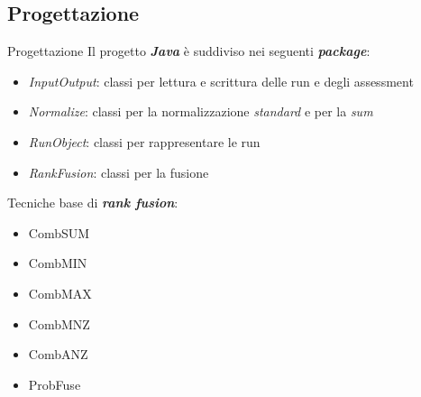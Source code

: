 \subsection{Progettazione}
\begin{frame}{Progettazione}
	Il progetto \textbf{\textit{Java}} è suddiviso nei seguenti \textbf{\textit{package}}:
	\begin{itemize}
		\item \textit{InputOutput}: classi per lettura e scrittura delle run e degli assessment 
		\item \textit{Normalize}: classi per la normalizzazione \textit{standard} e per la \textit{sum}
		\item \textit{RunObject}: classi per rappresentare le run
		\item \textit{RankFusion}: classi per la fusione
	\end{itemize}

	\vspace{1em}

	Tecniche base di \textbf{\textit{rank fusion}}:
	\begin{multicols}{2}
		\begin{itemize}
			\item CombSUM
			\item CombMIN
			\item CombMAX
			\item CombMNZ
			\item CombANZ
			\item ProbFuse
		\end{itemize}
	\end{multicols}
\end{frame}


